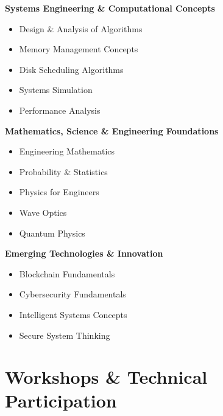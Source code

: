 \documentclass[a4paper,11pt]{article}
\begin{document}
\vspace{4pt}

\textbf{Systems Engineering \& Computational Concepts}
\begin{itemize}
    \item Design \& Analysis of Algorithms
    \item Memory Management Concepts
    \item Disk Scheduling Algorithms
    \item Systems Simulation
    \item Performance Analysis
\end{itemize}

\vspace{4pt}

\textbf{Mathematics, Science \& Engineering Foundations}
\begin{itemize}
    \item Engineering Mathematics
    \item Probability \& Statistics
    \item Physics for Engineers
    \item Wave Optics
    \item Quantum Physics
\end{itemize}

\vspace{4pt}

\textbf{Emerging Technologies \& Innovation}
\begin{itemize}
    \item Blockchain Fundamentals
    \item Cybersecurity Fundamentals
    \item Intelligent Systems Concepts
    \item Secure System Thinking
\end{itemize}







\section{Workshops \& Technical Participation}
\end{document}
